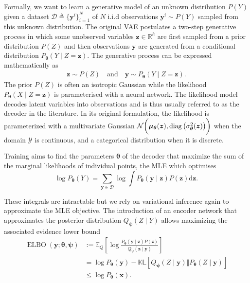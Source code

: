 Formally, we want to learn a generative model of an unknown distribution $P(Y)$ given a dataset $\mathcal{D} \triangleq \{\mathbf{y}^i\}^N_{i=1}$ of $N$ i.i.d observations $\mathbf{y}^i \sim P(Y)$ sampled from this unknown distribution.
The original VAE postulates a two-step generative process in which some unobserved variables $\mathbf{z} \in \mathbb{R}^h$ are first sampled from a prior distribution $P(Z)$ and then observations $\mathbf{y}$ are generated from a conditional distribution $P_{\mathbf{\theta}}(Y\mid Z=\mathbf{z})$. The generative process can be expressed mathematically as
\begin{align}
     \mathbf{z} \sim P(Z) \quad \text{and} \quad \mathbf{y} \sim P_{\mathbf{\theta}}(Y\mid Z=\mathbf{z}).
\end{align}
The prior $P(Z)$ is often an isotropic Gaussian while the likelihood $P_{\mathbf{\theta}}(X\mid Z=\mathbf{z})$ is parameterised with a neural network. The likelihood model decodes latent variables into observations and is thus usually referred to as the decoder in the literature. In its original formulation, the likelihood is parameterized with a multivariate Gaussian $\mathcal{N}\bigg(\mathbf{\mu_{\bm{\theta}}}(\mathbf{z}), \diag\big(\sigma_{\bm{\theta}}^2(\mathbf{z})\big)\bigg)$ when the domain $\mathcal{Y}$ is continuous, and a categorical distribution when it is discrete.

Training aims to find the parameters $\mathbf{\theta}$ of the decoder that maximize the sum of the marginal likelihoods of individual points, the MLE which optimises $$\log P_{\mathbf{\theta}}(Y)= \sum_{\mathbf{y}\in \mathcal{D}}\log \int P_{\mathbf{\theta}}(\mathbf{y}\mid \mathbf{z}) P(\mathbf{z}) \text{d}\mathbf{z}.$$

These integrals are intractable but we rely on variational inference again to approximate the MLE objective. The introduction of an encoder network that approximates the posterior distribution $Q_{\bm \psi}(Z\mid Y)$ allows maximizing the associated evidence lower bound
\begin{align}
    \operatorname{ELBO}(\bm{y}; \mathbf{\theta}, \mathbf{\psi})&:=\mathbb{E}_Q\left[\log \frac{P_{\mathbf{\theta}} (\mathbf{y}\mid \mathbf{z}) P(\mathbf{z})}{Q_\psi(\mathbf{z}\mid \mathbf{y})} \right]\label{eq:ELBO_VAE}\\
    &=\log P_{\mathbf{\theta}}(\mathbf{y}) - \mathbb{KL}\left[Q_{\bm \psi}(Z\mid \mathbf{y})\Vert P_{\mathbf{\theta}} (Z\mid \mathbf{y})\right]\\
    &\leq \log P_{\mathbf{\theta}}(\mathbf{x}).
\end{align}

